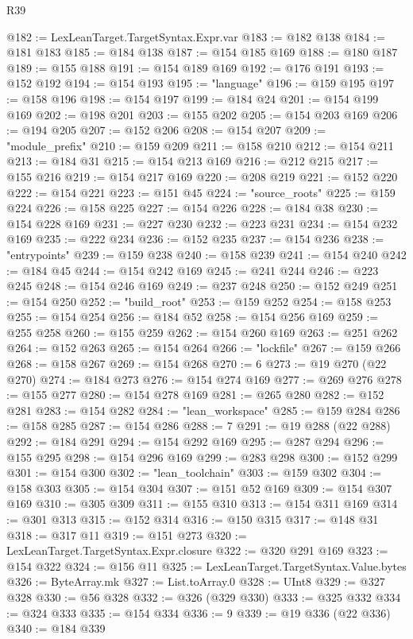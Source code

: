 \begin{lexlean}{R39}
\begin{coremodule}
@182 := LexLeanTarget.TargetSyntax.Expr.var
@183 := @182 @138
@184 := @181 @183
@185 := @184 @138
@187 := @154 @185 @169
@188 := @180 @187
@189 := @155 @188
@191 := @154 @189 @169
@192 := @176 @191
@193 := @152 @192
@194 := @154 @193
@195 := "language"
@196 := @159 @195
@197 := @158 @196
@198 := @154 @197
@199 := @184 @24
@201 := @154 @199 @169
@202 := @198 @201
@203 := @155 @202
@205 := @154 @203 @169
@206 := @194 @205
@207 := @152 @206
@208 := @154 @207
@209 := "module_prefix"
@210 := @159 @209
@211 := @158 @210
@212 := @154 @211
@213 := @184 @31
@215 := @154 @213 @169
@216 := @212 @215
@217 := @155 @216
@219 := @154 @217 @169
@220 := @208 @219
@221 := @152 @220
@222 := @154 @221
@223 := @151 @45
@224 := "source_roots"
@225 := @159 @224
@226 := @158 @225
@227 := @154 @226
@228 := @184 @38
@230 := @154 @228 @169
@231 := @227 @230
@232 := @223 @231
@234 := @154 @232 @169
@235 := @222 @234
@236 := @152 @235
@237 := @154 @236
@238 := "entrypoints"
@239 := @159 @238
@240 := @158 @239
@241 := @154 @240
@242 := @184 @45
@244 := @154 @242 @169
@245 := @241 @244
@246 := @223 @245
@248 := @154 @246 @169
@249 := @237 @248
@250 := @152 @249
@251 := @154 @250
@252 := "build_root"
@253 := @159 @252
@254 := @158 @253
@255 := @154 @254
@256 := @184 @52
@258 := @154 @256 @169
@259 := @255 @258
@260 := @155 @259
@262 := @154 @260 @169
@263 := @251 @262
@264 := @152 @263
@265 := @154 @264
@266 := "lockfile"
@267 := @159 @266
@268 := @158 @267
@269 := @154 @268
@270 := 6
@273 := @19 @270 (@22 @270)
@274 := @184 @273
@276 := @154 @274 @169
@277 := @269 @276
@278 := @155 @277
@280 := @154 @278 @169
@281 := @265 @280
@282 := @152 @281
@283 := @154 @282
@284 := "lean_workspace"
@285 := @159 @284
@286 := @158 @285
@287 := @154 @286
@288 := 7
@291 := @19 @288 (@22 @288)
@292 := @184 @291
@294 := @154 @292 @169
@295 := @287 @294
@296 := @155 @295
@298 := @154 @296 @169
@299 := @283 @298
@300 := @152 @299
@301 := @154 @300
@302 := "lean_toolchain"
@303 := @159 @302
@304 := @158 @303
@305 := @154 @304
@307 := @151 @52 @169
@309 := @154 @307 @169
@310 := @305 @309
@311 := @155 @310
@313 := @154 @311 @169
@314 := @301 @313
@315 := @152 @314
@316 := @150 @315
@317 := @148 @31
@318 := @317 @11
@319 := @151 @273
@320 := LexLeanTarget.TargetSyntax.Expr.closure
@322 := @320 @291 @169
@323 := @154 @322
@324 := @156 @11
@325 := LexLeanTarget.TargetSyntax.Value.bytes
@326 := ByteArray.mk
@327 := List.toArray.{0}
@328 := UInt8
@329 := @327 @328
@330 := @56 @328
@332 := @326 (@329 @330)
@333 := @325 @332
@334 := @324 @333
@335 := @154 @334
@336 := 9
@339 := @19 @336 (@22 @336)
@340 := @184 @339

\end{coremodule}
\end{lexlean}
